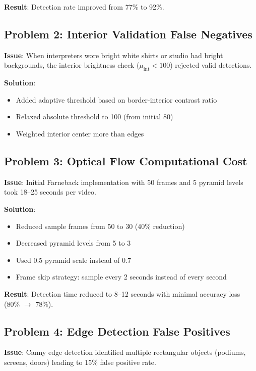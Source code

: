 \documentclass[11pt,a4paper]{article}
\begin{document}
\textbf{Result}: Detection rate improved from 77\% to 92\%.

\subsection{Problem 2: Interior Validation False Negatives}

\textbf{Issue}: When interpreters wore bright white shirts or studio had bright backgrounds, the interior brightness check ($\mu_{\text{int}} < 100$) rejected valid detections.

\textbf{Solution}:
\begin{itemize}
    \item Added adaptive threshold based on border-interior contrast ratio
    \item Relaxed absolute threshold to 100 (from initial 80)
    \item Weighted interior center more than edges
\end{itemize}

\subsection{Problem 3: Optical Flow Computational Cost}

\textbf{Issue}: Initial Farneback implementation with 50 frames and 5 pyramid levels took 18--25 seconds per video.

\textbf{Solution}:
\begin{itemize}
    \item Reduced sample frames from 50 to 30 (40\% reduction)
    \item Decreased pyramid levels from 5 to 3
    \item Used 0.5 pyramid scale instead of 0.7
    \item Frame skip strategy: sample every 2 seconds instead of every second
\end{itemize}

\textbf{Result}: Detection time reduced to 8--12 seconds with minimal accuracy loss (80\% $\rightarrow$ 78\%).

\subsection{Problem 4: Edge Detection False Positives}

\textbf{Issue}: Canny edge detection identified multiple rectangular objects (podiums, screens, doors) leading to 15\% false positive rate.
\end{document}
